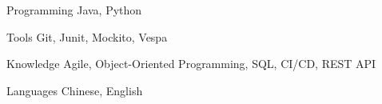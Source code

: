 

\begin{cvskills}

  \cvskill
    {Programming} %
    {Java, Python} %

  \cvskill
    {Tools} %
    {Git, Junit, Mockito, Vespa} %

  \cvskill
    {Knowledge} %
    {Agile, Object-Oriented Programming, SQL, CI/CD, REST API} %

  \cvskill
    {Languages} %
    {Chinese, English} %

\end{cvskills}
